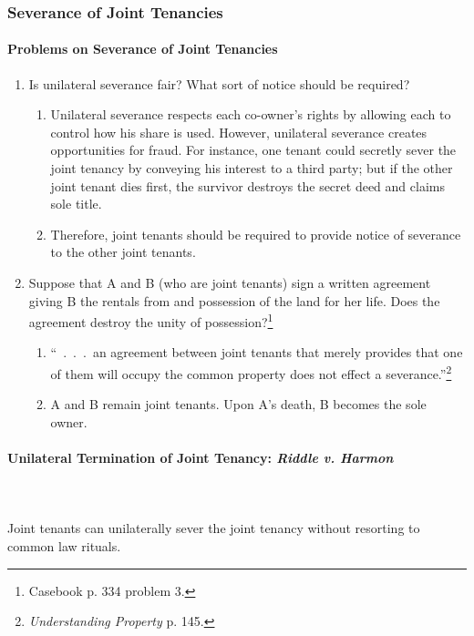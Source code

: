 \subsubsection{Severance of Joint Tenancies}

\paragraph{Problems on Severance of Joint Tenancies}

\begin{enumerate}
    \item Is unilateral severance fair? What sort of notice should be 
    required?
    \begin{enumerate}
        \item Unilateral severance respects each co-owner's rights by allowing 
        each to control how his share is used. However, unilateral severance 
        creates opportunities for fraud. For instance, one tenant could 
        secretly sever the joint tenancy by conveying his interest to a third 
        party; but if the other joint tenant dies first, the survivor destroys 
        the secret deed and claims sole title.
        \item Therefore, joint tenants should be required to provide notice of 
        severance to the other joint tenants.
    \end{enumerate}
    \item Suppose that A and B (who are joint tenants) sign a written 
    agreement giving B the rentals from and possession of the land for her 
    life. Does the agreement destroy the unity of 
    possession?\footnote{Casebook p. 334 problem 3.}
    \begin{enumerate}
        \item ``~.~.~.~an agreement between joint tenants that merely provides 
        that one of them will occupy the common property does not effect a 
        severance.''\footnote{\emph{Understanding Property} p. 145.}
        \item A and B remain joint tenants. Upon A's death, B becomes the sole 
        owner.
    \end{enumerate}
\end{enumerate}

\paragraph{Unilateral Termination of Joint Tenancy: \emph{Riddle v. Harmon}}
~\\\\
Joint tenants can unilaterally sever the joint tenancy without resorting to 
common law rituals.


